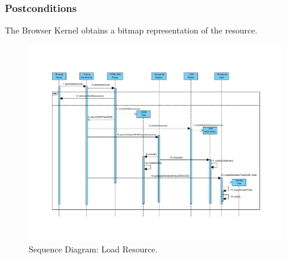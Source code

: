 \documentclass{sig-alternate-05-2015}
\begin{document}
    \subsubsection*{Postconditions} The Browser Kernel obtains a bitmap representation of the resource.
      \begin{figure}[h!t]
      \vspace*{-2cm}
          \centering
          \hspace*{-1cm}\includegraphics[scale=0.72]{figures/LoadResource.pdf}
          \vspace*{-2cm}
          \caption{Sequence Diagram: Load Resource.}
          \label{fig:LoadResource}
      \end{figure}
\end{document}
